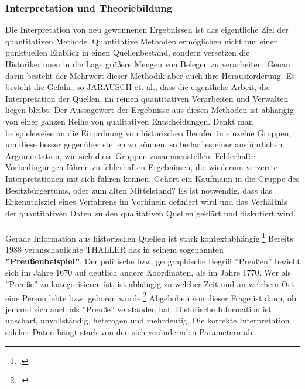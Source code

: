 \documentclass[12pt,a4paper]{article}
\begin{document}
\subsubsection{Interpretation und Theoriebildung}

Die Interpretation von neu gewonnenen Ergebnissen ist das eigentliche Ziel der quantitativen Methode. Quantitative Methoden ermöglichen nicht nur einen punktuellen Einblick in einen Quellenbestand, sondern versetzen die Historikerinnen in die Lage größere Mengen von Belegen zu verarbeiten. Genau darin besteht der Mehrwert dieser Methodik aber auch ihre Herausforderung. Es besteht die Gefahr, so JARAUSCH et. al., dass die eigentliche Arbeit, die Interpretation der Quellen, im reinen quantitativen Verarbeiten und Verwalten liegen bleibt. Der Aussagewert der Ergebnisse aus diesen Methoden ist abhängig von einer ganzen Reihe von qualitativen Entscheidungen. Denkt man beispielsweise an die Einordnung von historischen Berufen in einzelne Gruppen, um diese besser gegenüber stellen zu können, so bedarf es einer ausführlichen Argumentation, wie sich diese Gruppen zusammenstellen. Fehlerhafte  Vorbedingungen führen zu fehlerhaften Ergebnissen, die wiederum verzerrte Interpretationen mit sich führen können. Gehört ein Kaufmann in die Gruppe des Besitzbürgertums, oder zum alten Mittelstand? Es ist notwendig, dass das Erkenntnisziel eines Verfahrens im Vorhinein definiert wird und das Verhältnis der quantitativen Daten zu den qualitativen Quellen geklärt und diskutiert wird.
\\
\\
Gerade Information aus historischen Quellen ist stark kontextabhängig.\footcite[][S.182-193]{jarausch1985quantitative} Bereits 1988 veranschaulichte THALLER das in seinem sogenannten \textbf{''Preußenbeispiel''}. Der politische bzw. geographische Begriff ''Preußen'' bezieht sich im Jahre 1670 auf deutlich andere Koordinaten, als im Jahre 1770. Wer als ''Preuße'' zu kategorisieren ist, ist abhängig zu welcher Zeit und an welchem Ort eine Person lebte bzw. geboren wurde.\footcite[][S.264-266]{thaller2017historical} Abgehoben von dieser Frage ist dann, ob jemand sich auch als ''Preuße'' verstanden hat. Historische Information ist unscharf, unvollständig, heterogen und mehrdeutig. Die korrekte Interpretation solcher Daten hängt stark von den sich verändernden Parametern ab.
\end{document}
